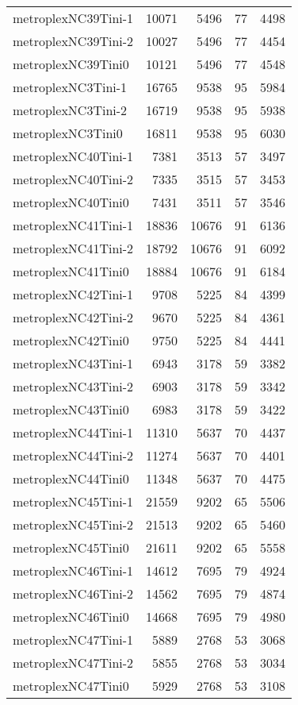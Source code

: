 \begin{longtable}{lrrrr}
metroplexNC39Tini-1 & 10071 & 5496 & 77 & 4498 \\
metroplexNC39Tini-2 & 10027 & 5496 & 77 & 4454 \\
metroplexNC39Tini0 & 10121 & 5496 & 77 & 4548 \\
metroplexNC3Tini-1 & 16765 & 9538 & 95 & 5984 \\
metroplexNC3Tini-2 & 16719 & 9538 & 95 & 5938 \\
metroplexNC3Tini0 & 16811 & 9538 & 95 & 6030 \\
metroplexNC40Tini-1 & 7381 & 3513 & 57 & 3497 \\
metroplexNC40Tini-2 & 7335 & 3515 & 57 & 3453 \\
metroplexNC40Tini0 & 7431 & 3511 & 57 & 3546 \\
metroplexNC41Tini-1 & 18836 & 10676 & 91 & 6136 \\
metroplexNC41Tini-2 & 18792 & 10676 & 91 & 6092 \\
metroplexNC41Tini0 & 18884 & 10676 & 91 & 6184 \\
metroplexNC42Tini-1 & 9708 & 5225 & 84 & 4399 \\
metroplexNC42Tini-2 & 9670 & 5225 & 84 & 4361 \\
metroplexNC42Tini0 & 9750 & 5225 & 84 & 4441 \\
metroplexNC43Tini-1 & 6943 & 3178 & 59 & 3382 \\
metroplexNC43Tini-2 & 6903 & 3178 & 59 & 3342 \\
metroplexNC43Tini0 & 6983 & 3178 & 59 & 3422 \\
metroplexNC44Tini-1 & 11310 & 5637 & 70 & 4437 \\
metroplexNC44Tini-2 & 11274 & 5637 & 70 & 4401 \\
metroplexNC44Tini0 & 11348 & 5637 & 70 & 4475 \\
metroplexNC45Tini-1 & 21559 & 9202 & 65 & 5506 \\
metroplexNC45Tini-2 & 21513 & 9202 & 65 & 5460 \\
metroplexNC45Tini0 & 21611 & 9202 & 65 & 5558 \\
metroplexNC46Tini-1 & 14612 & 7695 & 79 & 4924 \\
metroplexNC46Tini-2 & 14562 & 7695 & 79 & 4874 \\
metroplexNC46Tini0 & 14668 & 7695 & 79 & 4980 \\
metroplexNC47Tini-1 & 5889 & 2768 & 53 & 3068 \\
metroplexNC47Tini-2 & 5855 & 2768 & 53 & 3034 \\
metroplexNC47Tini0 & 5929 & 2768 & 53 & 3108 \\

\end{longtable}
